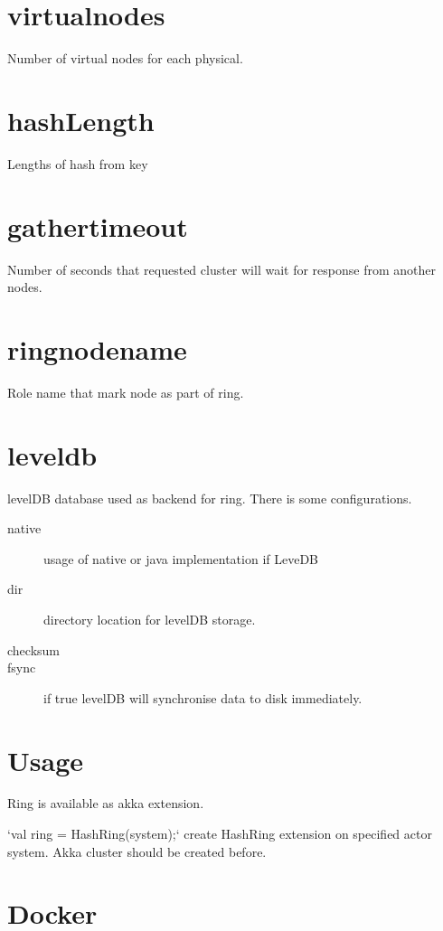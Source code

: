 \section*{virtual\-nodes} 

Number of virtual nodes for each physical.

\section*{hashLength}

Lengths of hash from key

\section*{gather\-timeout}
Number of seconds that requested cluster will wait for response from another nodes. 

\section*{ring\-node\-name}
Role name that mark node as part of ring.

\section*{leveldb}
levelDB database used as backend for ring. There is some configurations.

\begin{description}
\item[native] usage of native or java implementation if LeveDB
\item[dir] directory location for levelDB storage.
\item[checksum]
\item[fsync] if true levelDB will synchronise data to disk immediately.
\end{description}

\section*{Usage}

Ring is available as akka extension.

`val ring = HashRing(system);` \- create HashRing extension on specified actor system. Akka cluster should be created before.

\section*{Docker}
